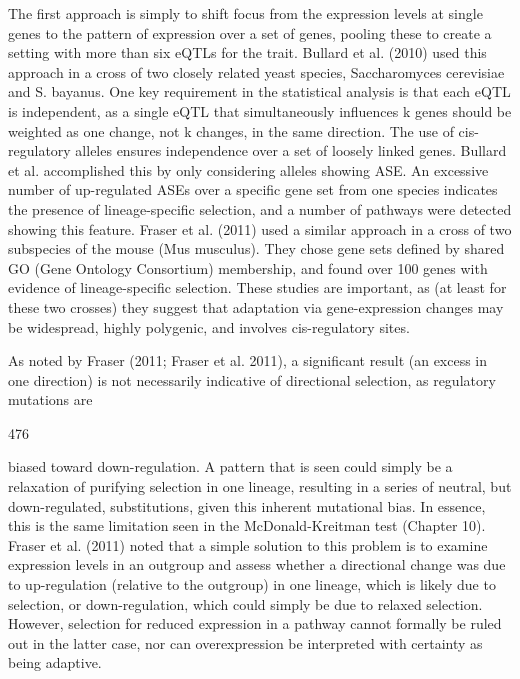 \documentclass{article}
\begin{document}
The first approach is simply to shift focus from the expression levels at single genes to the pattern of expression over a set of genes, pooling these to create a setting with more than six eQTLs for the trait. Bullard et al. (2010) used this approach in a cross of two closely related yeast species, Saccharomyces cerevisiae and S. bayanus. One key requirement in the statistical analysis is that each eQTL is independent, as a single eQTL that simultaneously influences k genes should be weighted as one change, not k changes, in the same direction. The use of cis-regulatory alleles ensures independence over a set of loosely linked genes. Bullard et al. accomplished this by only considering alleles showing ASE. An excessive number of up-regulated ASEs over a specific gene set from one species indicates the presence of lineage-specific selection, and a number of pathways were detected showing this feature. Fraser et al. (2011) used a similar approach in a cross of two subspecies of the mouse (Mus musculus). They chose gene sets defined by shared GO (Gene Ontology Consortium) membership, and found over 100 genes with evidence of lineage-specific selection. These studies are important, as (at least for these two crosses) they suggest that adaptation via gene-expression changes may be widespread, highly polygenic, and involves cis-regulatory sites.

As noted by Fraser (2011; Fraser et al. 2011), a significant result (an excess in one direction) is not necessarily indicative of directional selection, as regulatory mutations are

476

biased toward down-regulation. A pattern that is seen could simply be a relaxation of purifying selection in one lineage, resulting in a series of neutral, but down-regulated, substitutions, given this inherent mutational bias. In essence, this is the same limitation seen in the McDonald-Kreitman test (Chapter 10). Fraser et al. (2011) noted that a simple solution to this problem is to examine expression levels in an outgroup and assess whether a directional change was due to up-regulation (relative to the outgroup) in one lineage, which is likely due to selection, or down-regulation, which could simply be due to relaxed selection. However, selection for reduced expression in a pathway cannot formally be ruled out in the latter case, nor can overexpression be interpreted with certainty as being adaptive.
\end{document}

